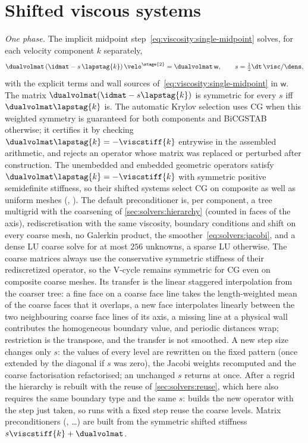 \section{Shifted viscous systems}\label{sec:solvers:shifted}
\emph{One phase.} The implicit midpoint step~\cref{eq:viscosity:single-midpoint}
solves, for each velocity component $k$ separately,
\begin{equation}\label{eq:solvers:shifted-single}
  \dualvolmat\roundpar{\idmat-s\,\lapstag{k}}\velo^{\stage{2}}=\dualvolmat\,\mathsf{w},
  \qquad s=\tfrac12\dt\,\visc/\dens,
\end{equation}
with the explicit terms and wall sources of~\cref{eq:viscosity:single-midpoint}
in $\mathsf{w}$. The matrix $\dualvolmat(\idmat-s\lapstag{k})$ is symmetric
for every $s$ iff $\dualvolmat\lapstag{k}$ is. The automatic Krylov selection
uses CG when this weighted symmetry is guaranteed for both components and
BiCGSTAB otherwise; it certifies it by checking
$\dualvolmat\lapstag{k}=-\viscstiff{k}$ entrywise in the assembled
arithmetic, and rejects an operator whose matrix was replaced or perturbed
after construction. The unembedded and embedded geometric operators satisfy
$\dualvolmat\lapstag{k}=-\viscstiff{k}$ with symmetric positive semidefinite
stiffness, so their shifted systems select CG on composite as well as
uniform meshes (, ). The default
preconditioner is, per component,
a tree multigrid with the coarsening of \cref{sec:solvers:hierarchy} (counted
in faces of the axis), rediscretisation with the same viscosity, boundary
conditions and shift on every coarse mesh, no Galerkin product, the
smoother~\cref{eq:solvers:jacobi}, and a dense LU coarse solve for at most
$256$ unknowns, a sparse LU otherwise. The coarse matrices always use the
conservative symmetric stiffness of their rediscretized operator, so the
V-cycle remains symmetric for CG even on composite coarse meshes. Its transfer
is the linear staggered interpolation from the coarser tree: a fine face on a
coarse face line takes the length-weighted mean of the coarse faces that it
overlaps, a new face interpolates linearly between the two neighbouring coarse
face lines of its axis, a missing line at a physical wall contributes the
homogeneous boundary value, and periodic distances wrap; restriction is the
transpose, and the transfer is not smoothed. A new step size changes only $s$:
the values of every level are rewritten on the fixed pattern (once extended by
the diagonal if $s$ was zero), the Jacobi weights recomputed and the coarse
factorisation refactorised; an unchanged $s$ returns at once. After a regrid
the hierarchy is rebuilt with the reuse of \cref{sec:solvers:reuse}, which
here also requires the same boundary type and the same $s$:
 builds the new operator with the step just taken, so runs with a fixed step
reuse the coarse levels. Matrix preconditioners (, \dots) are built
from the symmetric shifted stiffness $s\viscstiff{k}+\dualvolmat$.

